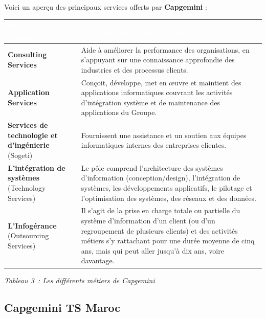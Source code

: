 \documentclass[12pt,a4paper]{report}
\begin{document}
Voici un aperçu des principaux services offerts par \textbf{Capgemini} :

\begin{longtable}[]{@{}
  >{\raggedright\arraybackslash}p{}
  >{\raggedright\arraybackslash}p{}@{}}
\toprule
\cellcolor{capgeminiblue}\textcolor{white}{\textbf{Services de Capgemini}} &
\cellcolor{capgeminiblue}\textcolor{white}{\textbf{Informations sur les services}} \\
\midrule
\endhead
\rowcolor{lightgray}
\textbf{Consulting Services} & Aide à améliorer la performance des organisations, en s'appuyant sur une connaissance approfondie des industries et des processus clients. \\
\textbf{Application Services} & Conçoit, développe, met en œuvre et maintient des applications informatiques couvrant les activités d'intégration système et de maintenance des applications du Groupe. \\
\rowcolor{lightgray}
\textbf{Services de technologie et d'ingénierie} (Sogeti) & Fournissent une assistance et un soutien aux équipes informatiques internes des entreprises clientes. \\
\textbf{L'intégration de systèmes} (Technology Services) & Le pôle comprend l'architecture des systèmes d'information (conception/design), l'intégration de systèmes, les développements applicatifs, le pilotage et l'optimisation des systèmes, des réseaux et des données. \\
\rowcolor{lightgray}
\textbf{L'Infogérance} (Outsourcing Services) & Il s'agit de la prise en charge totale ou partielle du système d'information d'un client (ou d'un regroupement de plusieurs clients) et des activités métiers s'y rattachant pour une durée moyenne de cinq ans, mais qui peut aller jusqu'à dix ans, voire davantage. \\
\bottomrule
\end{longtable}

\begin{center}
\textit{Tableau 3~: Les différents métiers de Capgemini}
\end{center}

\subsection{Capgemini TS Maroc}
\end{document}
